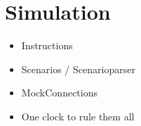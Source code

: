 \section{Simulation}
\begin{itemize}
    \item Instructions
    \item Scenarios / Scenarioparser
    \item MockConnections
    \item One clock to rule them all
\end{itemize}